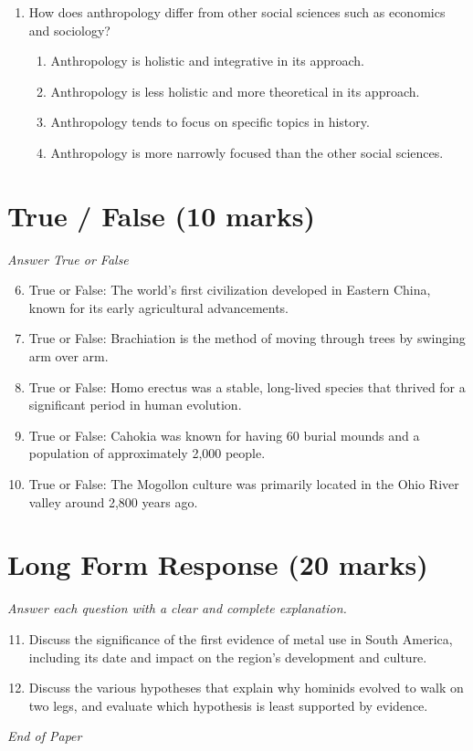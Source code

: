\documentclass[12pt]{article}
\begin{document}
\begin{enumerate}[label=\arabic*.]
\begin{enumerate}[label=(\alph*)]
    \item all of the above
\end{enumerate}
\item How does anthropology differ from other social sciences such as economics and sociology?
\begin{enumerate}[label=(\alph*)]
    \item Anthropology is holistic and integrative in its approach.
    \item Anthropology is less holistic and more theoretical in its approach.
    \item Anthropology tends to focus on specific topics in history.
    \item Anthropology is more narrowly focused than the other social sciences.
\end{enumerate}
\end{enumerate}

\section*{True / False (10 marks)}
\textit{Answer True or False}
\begin{enumerate}[label=\arabic*.]
\setcounter{enumi}{5}
\item True or False: The world's first civilization developed in Eastern China, known for its early agricultural advancements.
\item True or False: Brachiation is the method of moving through trees by swinging arm over arm.
\item True or False: Homo erectus was a stable, long-lived species that thrived for a significant period in human evolution.
\item True or False: Cahokia was known for having 60 burial mounds and a population of approximately 2,000 people.
\item True or False: The Mogollon culture was primarily located in the Ohio River valley around 2,800 years ago.
\end{enumerate}

\section*{Long Form Response (20 marks)}
\textit{Answer each question with a clear and complete explanation.}
\begin{enumerate}[label=\arabic*.]
\setcounter{enumi}{10}
\item Discuss the significance of the first evidence of metal use in South America, including its date and impact on the region's development and culture.
\item Discuss the various hypotheses that explain why hominids evolved to walk on two legs, and evaluate which hypothesis is least supported by evidence.
\end{enumerate}

\vfill
\noindent\textit{End of Paper}
\end{document}
